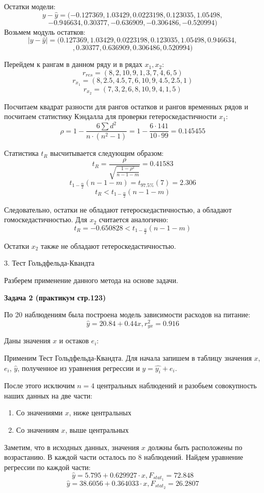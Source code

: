 \documentclass[aps,%
12pt,%
final,%
oneside,
onecolumn,%
musixtex, %
superscriptaddress,%
centertags]{article} %
\begin{document}
Остатки модели:
$$y - \widehat{y}  = (-0.127369, 1.03429, 0.0223198, 0.123035, 1.05498, $$
$$-0.946634, 0.30377, -0.636909, -0.306486, -0.520994)$$
Возьмем модуль остатков:
$$ |y - \widehat{y}| = (0.127369, 1.03429, 0.0223198, 0.123035, 1.05498, 0.946634,$$ 
$$,0.30377,0.636909, 0.306486, 0.520994)$$

Перейдем к рангам в данном ряду и в рядах $x_1 ,x_2$:
$$r_{res} =  (8, 2, 10, 9, 1, 3, 7, 4, 6, 5)$$
$$r_{x_1} = (8, 2.5, 4.5, 7, 6, 10, 9, 4.5, 2.5, 1)$$
$$r_{x_2} = (7, 3, 2, 6, 8, 10, 9, 4, 1, 5)$$

Посчитаем квадрат разности для рангов остатков и рангов временных рядов и посчитаем статистику Кэндалла для проверки гетероскедастичности $x_1$:
$$ \rho = 1 - \frac{6\sum d^2}{n \cdot (n^2 - 1)} = 1 - \frac{6 \cdot 141 }{10 \cdot 99} =0.145455 $$

Статистика $t_R$ высчитывается следующим образом:
$$t_R = \frac{\rho}{\sqrt{\frac{1-\rho^2}{n-1-m}}} =0.41583 $$
$$t_{1-\frac{\alpha}{2}}(n-1-m) = t_{97.5\%}(7) = 2.306$$
$$t_R < t_{1-\frac{\alpha}{2}}(n-1-m) $$

Следовательно, остатки не обладают гетероскедастичностью, а обладают гомоскедастичностью.
Для $x_2$ считается аналогично:
$$t_R = -0.650828 <  t_{1-\frac{\alpha}{2}}(n-1-m)$$

Остатки $x_2$ также не обладают гетероскедастичностью.

3. Тест Гольдфельда-Квандта

Разберем применение данного метода на основе задачи.

\textbf{Задача 2 (практикум стр.123)}

По 20 наблюдениям была построена модель зависимости расходов на питание:
$$\hat{y} = 20.84 + 0.44x, r_{yx}^2 = 0.916$$

Даны значения $x$ и остаков $e_i$:

Применим Тест Гольдфельда-Квандта. Для начала запишем в таблицу значения $x$, $e_i$, $\hat{y}$, полученное из уравнения регрессии и $y = \hat{y_i} + e_i$.

После этого исключим $n=4$ центральных наблюдений и разобьем совокупность наших данных на две части:

\begin{enumerate}
	\item Со значениями $x$, ниже центральных
	\item Со значениям $x$, выше центральных
\end{enumerate}

Заметим, что в исходных данных, значения $x$ должны быть расположены по возрастанию.
В каждой части осталось по 8 наблюдений.
Найдем уравнение регрессии по каждой части:
$$\hat{y} = 5.795 + 0.629927\cdot x, F_{stat_1} = 72.848 $$
$$\hat{y} = 38.6056 + 0.364033 \cdot x, F_{stat_2} = 26.2807$$
\end{document}
